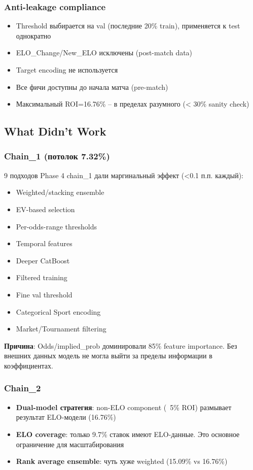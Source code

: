 \documentclass[12pt,a4paper]{article}
\begin{document}
\subsubsection{Anti-leakage compliance}
\begin{itemize}
  \item Threshold выбирается на val (последние 20\% train), применяется к test однократно
  \item ELO\_Change/New\_ELO исключены (post-match data)
  \item Target encoding не используется
  \item Все фичи доступны до начала матча (pre-match)
  \item Максимальный ROI=16.76\% -- в пределах разумного (< 30\% sanity check)
\end{itemize}

\subsection{What Didn't Work}

\subsubsection{Chain\_1 (потолок 7.32\%)}
9 подходов Phase 4 chain\_1 дали маргинальный эффект (<0.1 п.п. каждый):
\begin{itemize}
  \item Weighted/stacking ensemble
  \item EV-based selection
  \item Per-odds-range thresholds
  \item Temporal features
  \item Deeper CatBoost
  \item Filtered training
  \item Fine val threshold
  \item Categorical Sport encoding
  \item Market/Tournament filtering
\end{itemize}

\textbf{Причина}: Odds/implied\_prob доминировали 85\% feature importance. Без внешних данных модель не могла выйти за пределы информации в коэффициентах.

\subsubsection{Chain\_2}
\begin{itemize}
  \item \textbf{Dual-model стратегия}: non-ELO component (~5\% ROI) размывает результат ELO-модели (16.76\%)
  \item \textbf{ELO coverage}: только 9.7\% ставок имеют ELO-данные. Это основное ограничение для масштабирования
  \item \textbf{Rank average ensemble}: чуть хуже weighted (15.09\% vs 16.76\%)
\end{itemize}
\end{document}
